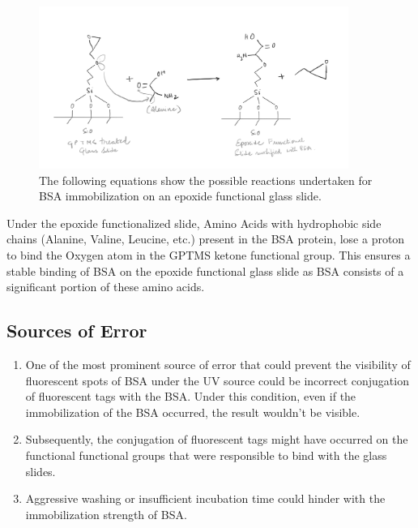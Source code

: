 \documentclass[pdflatex,sn-mathphys]{sn-jnl}%
\theoremstyle{thmstyleone}%
\theoremstyle{thmstyletwo}%
\theoremstyle{thmstylethree}%
\begin{document}
\begin{figure}[h]%
\centering
\includegraphics[width=0.9\textwidth]{photos/epoxide.jpg}
\caption{The following equations show the possible reactions undertaken for BSA immobilization on an epoxide functional glass slide. }\label{fig1}

\end{figure}
Under the epoxide functionalized slide, Amino Acids with hydrophobic side chains (Alanine, Valine, Leucine, etc.) present in the BSA protein, lose a proton to bind the Oxygen atom in the GPTMS ketone functional group. This ensures a stable binding of BSA on the epoxide functional glass slide as BSA consists of a significant portion of these amino acids.

\subsection{Sources of Error}\label{subsec2}
\begin{enumerate}
\item One of the most prominent source of error that could prevent the visibility of fluorescent spots of BSA under the UV source could be incorrect conjugation of fluorescent tags with the BSA. Under this condition, even if the immobilization of the BSA occurred, the result wouldn't be visible.
\item Subsequently, the conjugation of fluorescent tags might have occurred on the functional functional groups that were responsible to bind with the glass slides. 
\item Aggressive washing or insufficient incubation time could hinder with the immobilization strength of BSA.
\end{enumerate}
\end{document}
